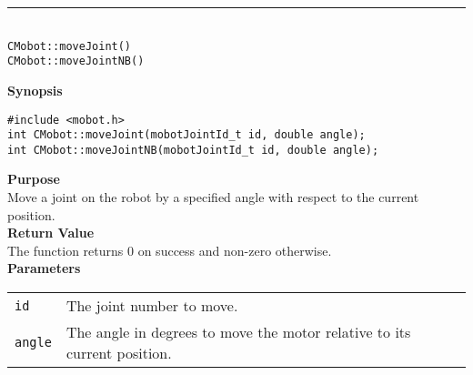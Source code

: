 \noindent
\vspace{5pt}
\rule{4.5in}{0.015in}\\
\noindent
{\LARGE \texttt{CMobot::moveJoint()}}\\
{\LARGE \texttt{CMobot::moveJointNB()}}\\
{}

\noindent
{\bf Synopsis}
\vspace{-8pt}
\begin{verbatim}
#include <mobot.h>
int CMobot::moveJoint(mobotJointId_t id, double angle);
int CMobot::moveJointNB(mobotJointId_t id, double angle);
\end{verbatim}

\noindent
{\bf Purpose}\\
Move a joint on the robot by a specified angle with respect to the current position.\\

\noindent
{\bf Return Value}\\
The function returns 0 on success and non-zero otherwise.\\

\noindent
{\bf Parameters}\\
\vspace{-0.1in}
\begin{description}
\item               
\begin{tabular}{p{10 mm}p{145 mm}}
\texttt{id} & The joint number to move. \\
\texttt{angle} & The angle in degrees to move the motor relative to its current position.  \\
\end{tabular}
\end{description}

